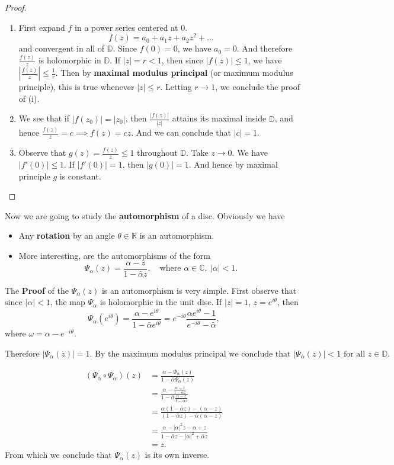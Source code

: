 \documentclass{article}
\begin{document}
\begin{proof} 
    \begin{enumerate}
\item
First expand $f$ in a power series centered at $0$.
$$f(z) = a_0 + a_1 z + a_2 z^2 + \dots$$
and convergent in all of $\mathbb{D}$. Since $f(0) = 0$, we have $a_0 = 0$.
And therefore $\frac{f(z)}{z}$ is holomorphic in $\mathbb{D}$. If $|z| = r < 1$, then since $|f(z)| \le 1$, we have $|\frac{f(z)}{z}| \le \frac{1}{r}$. Then by \textbf{maximal modulus principal} (or maximum modulus principle), this is true whenever $|z| \le r$.
Letting $r \to 1$, we conclude the proof of (i).
\item 
We see that if $|f(z_0)| = |z_0|$, then $\frac{|f(z)|}{|z|}$ attains its maximal inside $\mathbb{D}$, and hence $\frac{f(z)}{z} = c \implies f(z) = c z$.
And we can conclude that $|c| = 1$.
\item 
Observe that $g(z) = \frac{f(z)}{z} \le 1$ throughout $\mathbb{D}$.
Take $z \to 0$. We have $|f'(0)| \le 1$. If $|f'(0)| = 1$, then $|g(0)| = 1$.
And hence by maximal principle $g$ is constant.
    \end{enumerate}
\end{proof}

Now we are going to study the \textbf{automorphism} of a disc.
Obviously we have
\begin{itemize}
    \item Any \textbf{rotation} by an angle $\theta \in \mathbb{R}$ is an automorphism.
    \item More interesting, are the automorphisms of the form
    $$\Psi_\alpha(z) = \frac{\alpha - z}{1 - \bar{\alpha} z}, \quad \text{where } \alpha \in \mathbb{C}, \ |\alpha| < 1.$$
\end{itemize}

The \textbf{Proof} of the $\Psi_\alpha(z)$ is an automorphism is very simple.
First observe that since $|\alpha| < 1$, the map $\Psi_\alpha$ is holomorphic in the unit disc. If $|z| = 1$, $z = e^{i\theta}$, then
$$\Psi_\alpha(e^{i\theta}) = \frac{\alpha - e^{i\theta}}{1 - \bar{\alpha} e^{i\theta}} = e^{-i\theta} \frac{\alpha e^{i\theta} - 1}{e^{-i\theta} - \bar{\alpha}},$$
where $\omega = \alpha - e^{-i\theta}$.

$\text{Therefore } |\Psi_\alpha(z)| = 1. \text{ By the maximum modulus principal}
\text{ we conclude that } |\Psi_\alpha(z)| < 1 \text{ for all } z \in \mathbb{D}.$

\begin{align*}
(\Psi_\alpha \circ \Psi_\alpha)(z) &= \frac{\alpha - \Psi_\alpha(z)}{1 - \bar{\alpha} \Psi_\alpha(z)} \\
&= \frac{\alpha - \frac{\alpha - z}{1 - \bar{\alpha} z}}{1 - \bar{\alpha} \frac{\alpha - z}{1 - \bar{\alpha} z}} \\
&= \frac{\alpha(1 - \bar{\alpha} z) - (\alpha - z)}{(1 - \bar{\alpha} z) - \bar{\alpha}(\alpha - z)} \\
&= \frac{\alpha - |\alpha|^2 z - \alpha + z}{1 - \bar{\alpha} z - |\alpha|^2 + \bar{\alpha} z} \\
&= z.
\end{align*}
From which we conclude that $\Psi_\alpha(z)$ is its own inverse.
\end{document}
